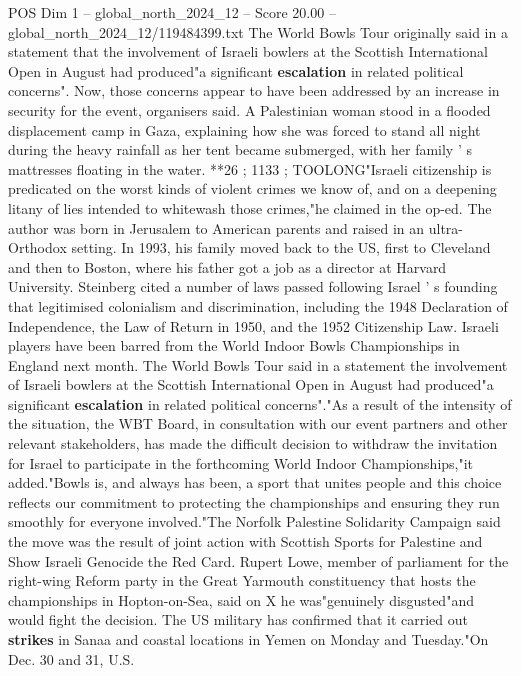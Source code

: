 \begin{textsample}{POS Dim 1 – global\_north\_2024\_12 – Score 20.00 – global\_north\_2024\_12/119484399.txt}  \label{ex:f1_pos_267}
The World Bowls Tour originally said in a statement that the involvement of Israeli bowlers at the Scottish International Open in August had produced"a significant \textbf{escalation} in related political concerns".
Now, those concerns appear to have been addressed by an increase in security for the event, organisers said.
A Palestinian woman stood in a flooded displacement camp in Gaza, explaining how she was forced to stand all night during the heavy rainfall as her tent became submerged, with her family ' s mattresses floating in the water. **26 ; 1133 ; TOOLONG"Israeli citizenship is predicated on the worst kinds of violent crimes we know of, and on a deepening litany of lies intended to whitewash those crimes,"he claimed in the op-ed.
The author was born in Jerusalem to American parents and raised in an ultra-Orthodox setting.
In 1993, his family moved back to the US, first to Cleveland and then to Boston, where his father got a job as a director at Harvard University.
Steinberg cited a number of laws passed following Israel ' s founding that legitimised colonialism and discrimination, including the 1948 Declaration of Independence, the Law of Return in 1950, and the 1952 Citizenship Law.
Israeli players have been barred from the World Indoor Bowls Championships in England next month.
The World Bowls Tour said in a statement the involvement of Israeli bowlers at the Scottish International Open in August had produced"a significant \textbf{escalation} in related political concerns"."As a result of the intensity of the situation, the WBT Board, in consultation with our event partners and other relevant stakeholders, has made the difficult decision to withdraw the invitation for Israel to participate in the forthcoming World Indoor Championships,"it added."Bowls is, and always has been, a sport that unites people and this choice reflects our commitment to protecting the championships and ensuring they run smoothly for everyone involved."The Norfolk Palestine Solidarity Campaign said the move was the result of joint action with Scottish Sports for Palestine and Show Israeli Genocide the Red Card.
Rupert Lowe, member of parliament for the right-wing Reform party in the Great Yarmouth constituency that hosts the championships in Hopton-on-Sea, said on X he was"genuinely disgusted"and would fight the decision.
The US military has confirmed that it carried out \textbf{strikes} in Sanaa and coastal locations in Yemen on Monday and Tuesday."On Dec. 30 and 31, U.S.

\end{textsample}
